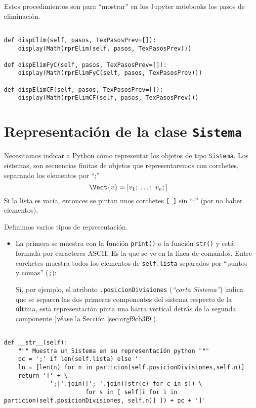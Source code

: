 \documentclass[11pt]{report}
\begin{document}
Estos procedimientos son para ``mostrar'' en los Jupyter notebooks los pasos de eliminación.

\begin{verbatim}

def dispElim(self, pasos, TexPasosPrev=[]):
    display(Math(rprElim(self, pasos, TexPasosPrev)))

def dispElimFyC(self, pasos, TexPasosPrev=[]):
    display(Math(rprElimFyC(self, pasos, TexPasosPrev)))

def dispElimCF(self, pasos, TexPasosPrev=[]):
    display(Math(rprElimCF(self, pasos, TexPasosPrev)))

\end{verbatim}

\section{Representación de la clase \texttt{Sistema}}
\label{sec:org5e7dd66}
Necesitamos indicar a Python cómo representar los objetos de tipo
\texttt{Sistema}. Los sistemas, son secuencias finitas de objetos que
representaremos con corchetes, separando los elementos por ``;''
\begin{displaymath}
  \Vect{v}=[v_1;\ \ldots;\ v_n;]
\end{displaymath}
Si la lista es vacía, entonces se pintan unos corchetes \texttt{[ ]} sin
 ``;'' (por no haber elementos). 

Definimos varios tipos de representación.

\begin{itemize}
\item La primera se muestra con la función \texttt{print()} o la función \texttt{str()}
y está formada por caracteres ASCII. Es la que se ve en la línea de
comandos. Entre corchetes muestra todos los elementos de
\texttt{self.lista} separados por ``puntos y comas'' (\texttt{;}):

Si, por ejemplo, el atributo \texttt{.posicionDivisiones} (\emph{``corta Sistema''}) indica que
se separen las dos primeras componentes del sistema respecto de la
última, esta representación pinta una barra vertical detrás de la
segunda componente (véase la Sección \ref{sec:orgf9cb3f9}).
\end{itemize}

\begin{verbatim}

def __str__(self):
    """ Muestra un Sistema en su representación python """
    pc = ';' if len(self.lista) else ''
    ln = [len(n) for n in particion(self.posicionDivisiones,self.n)]
    return '[' + \
             ';|'.join(['; '.join([str(c) for c in s]) \
                       for s in [ self|i for i in particion(self.posicionDivisiones, self.n)] ]) + pc + ']'

\end{verbatim}
\end{document}
